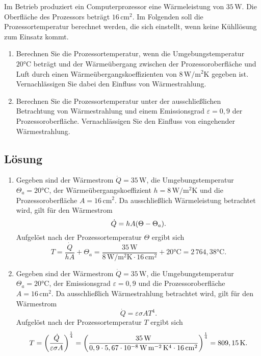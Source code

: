 \documentclass[german,12pt]{homework}
\DeclarePairedDelimiter{\enbrace}{(}{)}
\newcommand{\sis}[1]{\,\si{#1}}
\newcommand{\degC}{\si{\degreeCelsius}}
\begin{document}
    \begin{problem}
        Im Betrieb produziert ein Computerprozessor eine Wärmeleistung von
        \(35\,\si{\watt}\). Die Oberfläche des Prozessors beträgt
        \(16\,\si{\centi\meter\squared}\). Im Folgenden soll die
        Prozessortemperatur berechnet werden, die sich einstellt, wenn keine
        Kühllösung zum Einsatz kommt.
        \begin{enumerate}
            \item Berechnen Sie die Prozessortemperatur, wenn die
            Umgebungstemperatur \(20\degC\) beträgt und der
            Wärmeübergang zwischen der Prozessoroberfläche und Luft durch einen
            Wärmeübergangskoeffizienten von
            \(8\,\si{\watt\per\meter\squared\kelvin}\) gegeben ist.
            Vernachlässigen Sie dabei den Einfluss von Wärmestrahlung.
            \item Berechnen Sie die Prozessortemperatur unter der
            ausschließlichen Betrachtung von Wärmestrahlung und einem
            Emissionsgrad \(\varepsilon = 0,9\) der Prozessoroberfläche.
            Vernachlässigen Sie den Einfluss von eingehender Wärmestrahlung.
        \end{enumerate}
    \end{problem}

    \subsection*{Lösung}
    \begin{enumerate}
        \item Gegeben sind der Wärmestrom \(\dot{Q} = 35\sis{\watt}\), die
        Umgebungstemperatur \(\Theta_a = 20\degC\), der
        Wärmeübergangskoeffizient \(h = 8\sis{\watt\per\meter\squared\kelvin}\)
        und die Prozessoroberfläche \(A = 16\sis{\centi\meter\squared}\). Da
        ausschließlich Wärmeleistung betrachtet wird, gilt für den Wärmestrom
        \[\dot{Q} = hA\enbrace*{\Theta - \Theta_a}.\]
        Aufgelöst nach der Prozessortemperatur \(\Theta\) ergibt sich
        \[T = \frac{\dot{Q}}{hA} + \Theta_a = \frac{35\sis{\watt}}{8
        \sis{\watt\per\meter\squared\kelvin} \cdot 16
        \sis{\centi\meter\squared}} + 20\degC = 2\,764,38\degC.\]
        \item Gegeben sind der Wärmestrom \(\dot{Q} = 35\sis{\watt}\), die
        Umgebungstemperatur \(\Theta_a = 20\degC\), der Emissionsgrad
        \(\varepsilon = 0,9\) und die Prozessoroberfläche \(A = 16
        \sis{\centi\meter\squared}\). Da ausschließlich Wärmestrahlung
        betrachtet wird, gilt für den Wärmestrom
        \[\dot{Q} = \varepsilon\sigma{A}T^4.\]
        Aufgelöst nach der Prozessortemperatur \(T\) ergibt sich
        \[T = \enbrace*{\frac{\dot{Q}}{\varepsilon\sigma{A}}}^\frac{1}{4}
        = \enbrace*{\frac{35\sis{\watt}}{0,9 \cdot 5,67 \cdot 10^{-8}
        \sis{\watt\per\meter\squared\kelvin\tothe{4}} \cdot 16
        \sis{\centi\meter\squared}}}^\frac{1}{4} = 809,15\sis{\kelvin}.\]
    \end{enumerate}
\end{document}
